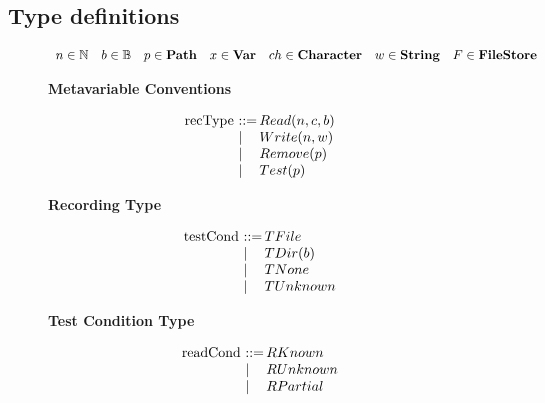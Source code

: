 \subsection*{Type definitions}

\begin{figure*}
\begin{minipage}[t]{\linewidth}
\begin{displaymath}
\begin{array}{l@{\quad}l@{\quad}l@{\quad}l@{\quad}l@{\quad}l@{\quad}l@{\quad}l@{}}
n \in \mathbb{N} & b \in \mathbb{B} & p \in \textbf{Path} & x \in \textbf{Var} &
ch \in \textbf{Character} & w \in \textbf{String} &  F \in \textbf{FileStore} 
\end{array}
\end{displaymath}
\centerline{\textbf{Metavariable Conventions}}
\end{minipage}
\begin{minipage}[t]{0.24\linewidth}
\begin{displaymath}
\begin{array}{l@{~}l@{\,}ll@{}}
 \text{recType} & ::= & Read(n,c,b) \\
 & \mid & Write(n,w) \\
 & \mid & Remove(p) \\
 & \mid & Test(p)
\end{array}
\end{displaymath}
\centerline{\textbf{Recording Type}}
\end{minipage}
\begin{minipage}[t]{0.24\linewidth}
\begin{displaymath}
\begin{array}{l@{~}l@{\,}ll@{}}
 \text{testCond} & ::= & TFile \\
 & \mid & TDir(b) \\
 & \mid & TNone \\
 & \mid & TUnknown
\end{array}
\end{displaymath}
\centerline{\textbf{Test Condition Type}}
\end{minipage}
\begin{minipage}[t]{0.24\linewidth}
\begin{displaymath}
\begin{array}{l@{~}l@{\,}ll@{}}
 \text{readCond} & ::= & RKnown \\
 & \mid & RUnknown \\
 & \mid & RPartial \\
 & &
\end{array}

\end{displaymath}
\end{minipage}
\end{figure*}
